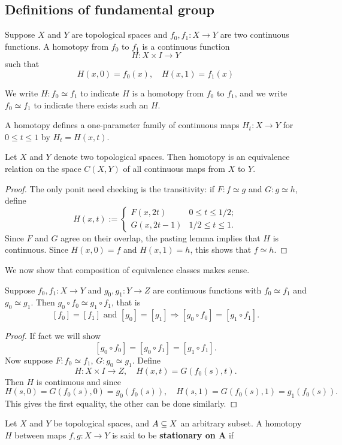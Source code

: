 \subsection{Definitions of fundamental group}
\begin{definition}
Suppose $X$ and $Y$ are topological spaces and $f_0,f_1:X\to Y$ are two continuous functions. A homotopy from $f_0$ to $f_1$ is a continuous function
\[H:X\times I\to Y\]
such that
\[H(x,0)=f_0(x),\quad H(x,1)=f_1(x)\]
\end{definition}
We write $H:f_0\simeq f_1$ to indicate $H$ is a homotopy from $f_0$ to $f_1$, and we write $f_0\simeq f_1$ to indicate there exists such an $H$.\par
A homotopy defines a one-parameter family of continuous maps $H_t:X\to Y$ for $0\leq t\leq1$ by $H_t=H(x,t)$.
\begin{proposition}
Let $X$ and $Y$ denote two topological spaces. Then homotopy is an equivalence relation on the space $C(X,Y)$ of all continuous maps from $X$ to $Y$.
\end{proposition}
\begin{proof}
The only ponit need checking is the transitivity: if $F:f\simeq g$ and $G:g\simeq h$, define
\[H(x,t):=\begin{cases}
F(x,2t)&0\leq t\leq 1/2;\\
G(x,2t-1)&1/2\leq t\leq 1.
\end{cases}\]
Since $F$ and $G$ agree on their overlap, the pasting lemma implies that $H$ is continuous. Since $H(x,0)=f$ and $H(x,1)=h$, this shows that $f\simeq h$.
\end{proof}
We now show that composition of equivalence classes makes sense.
\begin{proposition}
Suppose $f_0,f_1:X\to Y$ and $g_0,g_1:Y\to Z$ are continuous functions with $f_0\simeq f_1$ and $g_0\simeq g_1$. Then $g_0\circ f_0\simeq g_1\circ f_1$, that is
\[[f_0]=[f_1]\text{ and }[g_0]=[g_1]\Rightarrow [g_0\circ f_0]=[g_1\circ f_1].\]
\end{proposition}
\begin{proof}
If fact we will show
\[[g_0\circ f_0]=[g_0\circ f_1]=[g_1\circ f_1].\]
Now suppose $F:f_0\simeq f_1$, $G:g_0\simeq g_1$. Define
\[H:X\times I\to Z,\quad H(x,t)=G(f_0(s),t).\]
Then $H$ is continuous and since
\[H(s,0)=G(f_0(s),0)=g_0(f_0(s)),\quad H(s,1)=G(f_0(s),1)=g_1(f_0(s)).\]
This gives the first equality, the other can be done similarly.
\end{proof}
Let $X$ and $Y$ be topological spaces, and $A\subseteq X$ an arbitrary subset. A homotopy $H$ between maps $f,g:X\to Y$ is said to be \textbf{stationary on $\bm{A}$} if
